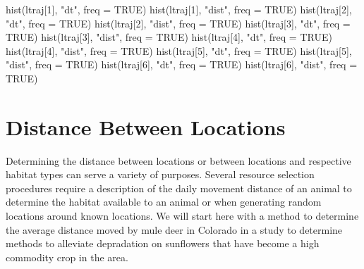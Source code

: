\documentclass[
  letterpaper,
]{book}
\newenvironment{Shaded}{\begin{snugshade}}{\end{snugshade}}
\newcommand{\AttributeTok}[1]{\textcolor[rgb]{0.40,0.45,0.13}{#1}}
\newcommand{\ConstantTok}[1]{\textcolor[rgb]{0.56,0.35,0.01}{#1}}
\newcommand{\DecValTok}[1]{\textcolor[rgb]{0.68,0.00,0.00}{#1}}
\newcommand{\FunctionTok}[1]{\textcolor[rgb]{0.28,0.35,0.67}{#1}}
\newcommand{\NormalTok}[1]{\textcolor[rgb]{0.00,0.23,0.31}{#1}}
\newcommand{\StringTok}[1]{\textcolor[rgb]{0.13,0.47,0.30}{#1}}
\begin{document}
\begin{Shaded}
\begin{Highlighting}[]
\FunctionTok{hist}\NormalTok{(ltraj[}\DecValTok{1}\NormalTok{], }\StringTok{"dt"}\NormalTok{, }\AttributeTok{freq =} \ConstantTok{TRUE}\NormalTok{)}
\FunctionTok{hist}\NormalTok{(ltraj[}\DecValTok{1}\NormalTok{], }\StringTok{"dist"}\NormalTok{, }\AttributeTok{freq =} \ConstantTok{TRUE}\NormalTok{)}
\FunctionTok{hist}\NormalTok{(ltraj[}\DecValTok{2}\NormalTok{], }\StringTok{"dt"}\NormalTok{, }\AttributeTok{freq =} \ConstantTok{TRUE}\NormalTok{)}
\FunctionTok{hist}\NormalTok{(ltraj[}\DecValTok{2}\NormalTok{], }\StringTok{"dist"}\NormalTok{, }\AttributeTok{freq =} \ConstantTok{TRUE}\NormalTok{)}
\FunctionTok{hist}\NormalTok{(ltraj[}\DecValTok{3}\NormalTok{], }\StringTok{"dt"}\NormalTok{, }\AttributeTok{freq =} \ConstantTok{TRUE}\NormalTok{)}
\FunctionTok{hist}\NormalTok{(ltraj[}\DecValTok{3}\NormalTok{], }\StringTok{"dist"}\NormalTok{, }\AttributeTok{freq =} \ConstantTok{TRUE}\NormalTok{)}
\FunctionTok{hist}\NormalTok{(ltraj[}\DecValTok{4}\NormalTok{], }\StringTok{"dt"}\NormalTok{, }\AttributeTok{freq =} \ConstantTok{TRUE}\NormalTok{)}
\FunctionTok{hist}\NormalTok{(ltraj[}\DecValTok{4}\NormalTok{], }\StringTok{"dist"}\NormalTok{, }\AttributeTok{freq =} \ConstantTok{TRUE}\NormalTok{)}
\FunctionTok{hist}\NormalTok{(ltraj[}\DecValTok{5}\NormalTok{], }\StringTok{"dt"}\NormalTok{, }\AttributeTok{freq =} \ConstantTok{TRUE}\NormalTok{)}
\FunctionTok{hist}\NormalTok{(ltraj[}\DecValTok{5}\NormalTok{], }\StringTok{"dist"}\NormalTok{, }\AttributeTok{freq =} \ConstantTok{TRUE}\NormalTok{)}
\FunctionTok{hist}\NormalTok{(ltraj[}\DecValTok{6}\NormalTok{], }\StringTok{"dt"}\NormalTok{, }\AttributeTok{freq =} \ConstantTok{TRUE}\NormalTok{)}
\FunctionTok{hist}\NormalTok{(ltraj[}\DecValTok{6}\NormalTok{], }\StringTok{"dist"}\NormalTok{, }\AttributeTok{freq =} \ConstantTok{TRUE}\NormalTok{)}
\end{Highlighting}
\end{Shaded}

\hypertarget{distance-between-locations}{%
\chapter{Distance Between Locations}\label{distance-between-locations}}

Determining the distance between locations or between locations and
respective habitat types can serve a variety of purposes. Several
resource selection procedures require a description of the daily
movement distance of an animal to determine the habitat available to an
animal or when generating random locations around known locations. We
will start here with a method to determine the average distance moved by
mule deer in Colorado in a study to determine methods to alleviate
depradation on sunflowers that have become a high commodity crop in the
area.
\end{document}
